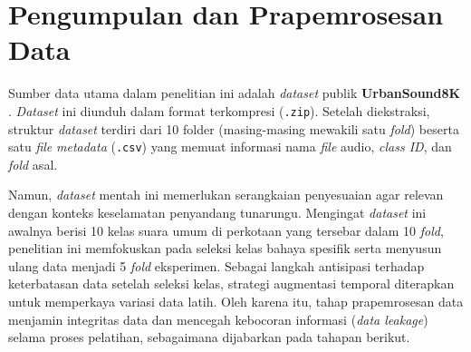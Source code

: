 \section{Pengumpulan dan Prapemrosesan Data} \label{III.Preprocessing}
Sumber data utama dalam penelitian ini adalah \textit{dataset} publik \textbf{UrbanSound8K} \cite{salamon2014dataset}.
\textit{Dataset} ini diunduh dalam format terkompresi (\texttt{.zip}).
Setelah diekstraksi, struktur \textit{dataset} terdiri dari 10 folder (masing-masing mewakili satu \textit{fold}) beserta satu \textit{file} \textit{metadata} (\texttt{.csv}) yang memuat informasi nama \textit{file} audio, \textit{class ID}, dan \textit{fold} asal. \par

Namun, \textit{dataset} mentah ini memerlukan serangkaian penyesuaian agar relevan dengan konteks keselamatan penyandang tunarungu. 
Mengingat \textit{dataset} ini awalnya berisi 10 kelas suara umum di perkotaan yang tersebar dalam 10 \textit{fold}, penelitian ini memfokuskan pada seleksi kelas bahaya spesifik serta menyusun ulang data menjadi 5 \textit{fold} eksperimen.
Sebagai langkah antisipasi terhadap keterbatasan data setelah seleksi kelas, strategi augmentasi temporal diterapkan untuk memperkaya variasi data latih.
Oleh karena itu, tahap prapemrosesan data menjamin integritas data dan mencegah kebocoran informasi (\textit{data leakage}) selama proses pelatihan, sebagaimana dijabarkan pada tahapan berikut.\par

